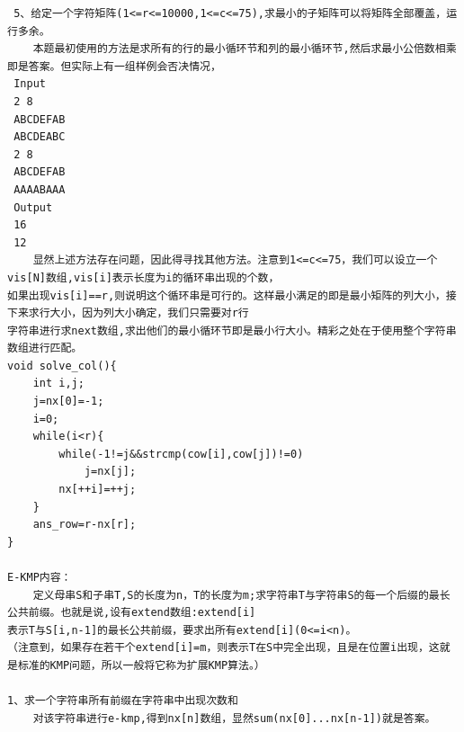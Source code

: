 \documentclass[twoside]{article}
\begin{document}
\begin{lstlisting}
 5、给定一个字符矩阵(1<=r<=10000,1<=c<=75),求最小的子矩阵可以将矩阵全部覆盖，运行多余。
    本题最初使用的方法是求所有的行的最小循环节和列的最小循环节,然后求最小公倍数相乘即是答案。但实际上有一组样例会否决情况，
 Input
 2 8
 ABCDEFAB
 ABCDEABC
 2 8
 ABCDEFAB
 AAAABAAA
 Output
 16
 12
    显然上述方法存在问题，因此得寻找其他方法。注意到1<=c<=75，我们可以设立一个vis[N]数组,vis[i]表示长度为i的循环串出现的个数，
如果出现vis[i]==r,则说明这个循环串是可行的。这样最小满足的即是最小矩阵的列大小，接下来求行大小，因为列大小确定，我们只需要对r行
字符串进行求next数组,求出他们的最小循环节即是最小行大小。精彩之处在于使用整个字符串数组进行匹配。
void solve_col(){
    int i,j;
    j=nx[0]=-1;
    i=0;
    while(i<r){
        while(-1!=j&&strcmp(cow[i],cow[j])!=0)
            j=nx[j];
        nx[++i]=++j;
    }
    ans_row=r-nx[r];
}

E-KMP内容：
    定义母串S和子串T,S的长度为n，T的长度为m;求字符串T与字符串S的每一个后缀的最长公共前缀。也就是说,设有extend数组:extend[i]
表示T与S[i,n-1]的最长公共前缀，要求出所有extend[i](0<=i<n)。
（注意到，如果存在若干个extend[i]=m，则表示T在S中完全出现，且是在位置i出现，这就是标准的KMP问题，所以一般将它称为扩展KMP算法。）

1、求一个字符串所有前缀在字符串中出现次数和
    对该字符串进行e-kmp,得到nx[n]数组，显然sum(nx[0]...nx[n-1])就是答案。\end{lstlisting}
\end{document}

